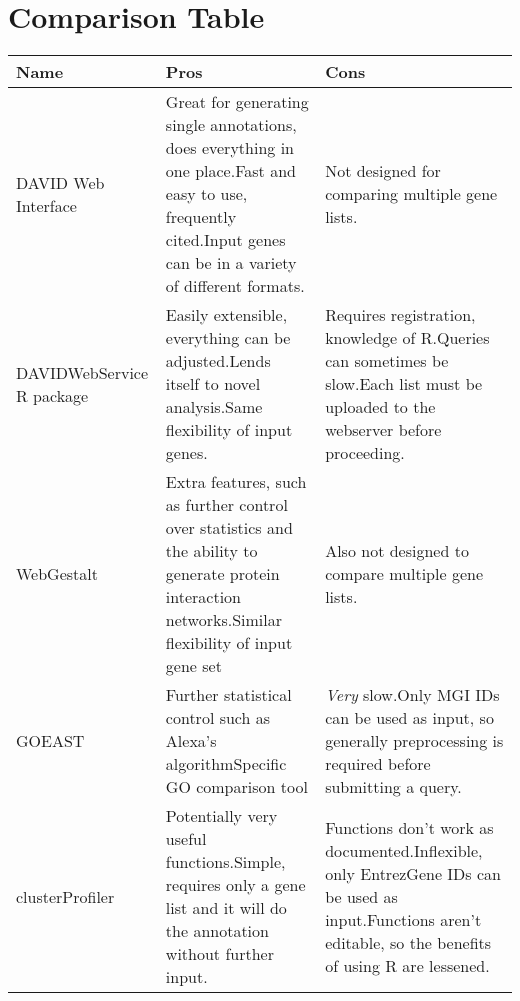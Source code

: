 \documentclass[11pt, oneside]{article}
\begin{document}
\section*{Comparison Table}
\begin{tabular}{ | p{5cm} | p{5cm} | p{5cm} |}
\hline
Name & Pros & Cons \\
\hline
DAVID Web Interface & Great for generating single annotations, does everything in one place.\newline Fast and easy to use, frequently cited.\newline Input genes can be in a variety of different formats. & Not designed for comparing multiple gene lists.\\
\hline
DAVIDWebService R package & Easily extensible, everything can be adjusted.\newline Lends itself to novel analysis.\newline Same flexibility of input genes. & Requires registration, knowledge of R.\newline Queries can sometimes be slow.\newline Each list must be uploaded to the webserver before proceeding.\\
\hline
WebGestalt & Extra features, such as further control over statistics and the ability to generate protein interaction networks.\newline Similar flexibility of input gene set & Also not designed to compare multiple gene lists.\\
\hline
GOEAST & Further statistical control such as Alexa's algorithm\newline Specific GO comparison tool & \emph{Very} slow.\newline Only MGI IDs can be used as input, so generally preprocessing is required before submitting a query.\\
\hline
clusterProfiler & Potentially very useful functions.\newline Simple, requires only a gene list and it will do the annotation without further input. & Functions don't work as documented.\newline Inflexible, only EntrezGene IDs can be used as input.\newline Functions aren't editable, so the benefits of using R are lessened.\\
\hline

\end{tabular}
\end{document}
